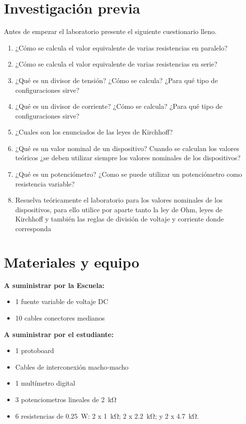 \documentclass[12pt,letterpaper]{report}
\newcommand{\inv}{Investigación previa}
\newcommand{\mat}{Materiales y equipo}
\newcommand{\antesde}{Antes de empezar el laboratorio presente el siguiente cuestionario lleno.}
\begin{document}
\section{\inv}
\antesde
\begin{enumerate}
\item	¿Cómo se calcula el valor equivalente de varias resistencias en paralelo?
\item	¿Cómo se calcula el valor equivalente de varias resistencias en serie?
\item	¿Qué es un divisor de tensión? ¿Cómo se calcula? ¿Para qué tipo de configuraciones sirve?
\item	¿Qué es un divisor de corriente? ¿Cómo se calcula? ¿Para qué tipo de configuraciones sirve?
\item	¿Cuales son los enunciados de las leyes de Kirchhoff?
\item	¿Qué es un valor nominal de un dispositivo? Cuando se calculan los valores teóricos ¿se deben utilizar siempre los valores nominales de los dispositivos?
\item	¿Qué es un potenciómetro? ¿Como se puede utilizar un potenciómetro como resistencia variable?
\item	Resuelva teóricamente el laboratorio para los valores nominales de los dispositivos, para ello utilice por aparte tanto la ley de Ohm, leyes de Kirchhoff y también las reglas de división de voltaje y corriente donde corresponda
\end{enumerate}

\section{\mat}
\textbf{A suministrar por la Escuela:}
\begin{itemize}
\item	1 fuente variable de voltaje DC
\item   10 cables conectores medianos
\end{itemize}
\textbf{A suministrar por el estudiante:}
\begin{itemize}
\item   1 protoboard
\item   Cables de interconexión macho-macho
\item   1 multímetro digital
\item   3 potenciometros lineales de \SI{2}{\kilo\ohm}
\item   6 resistencias de \SI{0,25}{\watt}: 2 x \SI{1}{\kilo\ohm}; 2 x \SI{2,2}{\kilo\ohm}; y 2 x \SI{4,7}{\kilo\ohm}.
\end{itemize}
\end{document}
